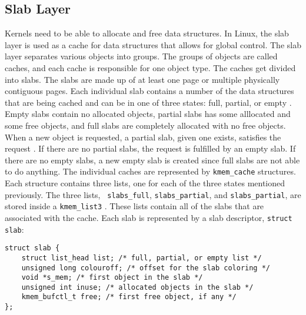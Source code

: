 \subsection{Slab Layer}
Kernels need to be able to allocate and free data structures. In Linux, the slab layer is used as a cache for data structures that allows for global control. The slab layer separates various objects into groups. The groups of objects are called caches, and each cache is responsible for one object type\cite{LinuxTextbook}. The caches get divided into slabs. The slabs are made up of at least one page or multiple physically contiguous pages. Each individual slab contains a number of the data structures that are being cached and can be in one of three states: full, partial, or empty \cite{LinuxTextbook}. Empty slabs contain no allocated objects, partial slabs has some alllocated and some free objects, and full slabs are completely allocated with no free objects. When a new object is requested, a partial slab, given one exists, satisfies the request \cite{LinuxTextbook}. If there are no partial slabs, the request is fulfilled by an empty slab. If there are no empty slabs, a new empty slab is created since full slabs are not able to do anything. 
\newline
\newline
\noindent
The individual caches are represented by \lstinline{kmem_cache} structures. Each structure contains three lists, one for each of the three states mentioned previously. The three lists, \lstinline{ slabs_full}, \lstinline{slabs_partial}, and \lstinline{slabs_partial}, are stored inside a \lstinline{kmem_list3} \cite{LinuxTextbook}. These lists contain all of the slabs that are associated with the cache. Each slab is represented by a slab descriptor, \lstinline{struct slab}:
\begin{lstlisting}
struct slab {
    struct list_head list; /* full, partial, or empty list */
    unsigned long colouroff; /* offset for the slab coloring */
    void *s_mem; /* first object in the slab */
    unsigned int inuse; /* allocated objects in the slab */
    kmem_bufctl_t free; /* first free object, if any */
};
\end{lstlisting}
